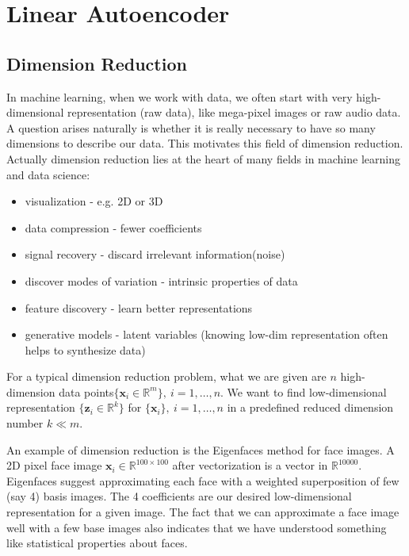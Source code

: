 \documentclass[../main.tex]{subfiles}
\begin{document}
\chapter{Linear Autoencoder}

\section{Dimension Reduction}
In machine learning, when we work with data, we often start with very high-dimensional representation (raw data), like mega-pixel images or raw audio data. A question arises naturally is whether it is really necessary to have so many dimensions to describe our data. This motivates this field of dimension reduction. Actually dimension reduction lies at the heart of many fields in machine learning and data science:
\begin{itemize}
	\item visualization - e.g. 2D or 3D
	\item data compression - fewer coefficients
	\item signal recovery - discard irrelevant information(noise)
	\item discover modes of variation - intrinsic properties of data
	\item feature discovery - learn better representations
	\item generative models - latent variables (knowing low-dim representation often helps to synthesize data)
\end{itemize}
\par For a typical dimension reduction problem, what we are given are $n$ high-dimension data points$\{\bm{x}_i\in\mathbb{R}^{m}\},\ i=1,\dots,n$.
We want to find low-dimensional representation $\{\bm{z}_i\in \mathbb{R}^k\}$ for $\{\bm{x}_i\},\ i=1,\dots,n$ in a predefined reduced dimension number $k\ll m$.
\par An example of dimension reduction is the Eigenfaces method for face images. A 2D pixel face image $\bm{x}_i\in \mathbb{R}^{100\times 100}$ after vectorization is a vector in $\mathbb{R}^{10000}$. Eigenfaces suggest approximating each face with a weighted superposition of few (say 4) basis images. The 4 coefficients are our desired low-dimensional representation for a given image. The fact that we can approximate a face image well with a few base images also indicates that we have understood something like statistical properties about faces.
\end{document}
